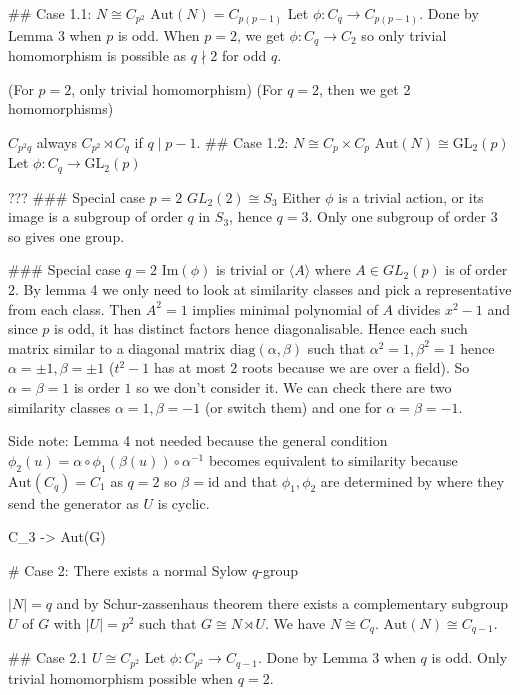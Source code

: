 ## Case 1.1: $N \cong C_{p^2}$
$\text{Aut}(N) = C_{p(p-1)}$
Let $\phi : C_q \rightarrow C_{p(p-1)}$. Done by Lemma 3 when $p$ is odd. When $p = 2$, we get $\phi : C_q \rightarrow C_2$ so only trivial homomorphism is possible as $q \nmid 2$ for odd $q$.

(For $p = 2$, only trivial homomorphism)
(For $q = 2$, then we get 2 homomorphisms)

$C_{p^2 q}$ always
$C_{p^2} \rtimes C_q$ if $q \mid p - 1$.
## Case 1.2: $N \cong C_p \times C_p$
$\text{Aut}(N) \cong \text{GL}_2(p)$
Let $\phi : C_q \rightarrow \text{GL}_2(p)$

???
### Special case $p = 2$
$GL_2(2) \cong S_3$
Either $\phi$ is a trivial action, or its image is a subgroup of order $q$ in $S_3$, hence $q = 3$. Only one subgroup of order $3$ so gives one group.

### Special case $q = 2$
$\text{Im}(\phi)$ is trivial or $\langle A \rangle$ where $A \in GL_2(p)$ is of order $2$. By lemma 4 we only need to look at similarity classes and pick a representative from each class. Then $A^2 = 1$ implies minimal polynomial of $A$ divides $x^2 - 1$ and since $p$ is odd, it has distinct factors hence diagonalisable. Hence each such matrix similar to a diagonal matrix $\text{diag}(\alpha, \beta)$ such that $\alpha^2 = 1, \beta^2 = 1$ hence $\alpha = \pm 1, \beta = \pm 1$ ($t^2 - 1$ has at most $2$ roots because we are over a field). So $\alpha = \beta = 1$ is order $1$ so we don't consider it. We can check there are two similarity classes $\alpha = 1, \beta = -1$ (or switch them) and one for $\alpha = \beta = -1$.

Side note: Lemma 4 not needed because the general condition $\phi_2(u) = \alpha \circ \phi_1(\beta(u)) \circ \alpha^{-1}$ becomes equivalent to similarity because $\text{Aut}(C_q) = C_1$ as $q = 2$ so $\beta = \text{id}$ and that $\phi_1, \phi_2$ are determined by where they send the generator as $U$ is cyclic.

C_3 -> Aut(G)

# Case 2: There exists a normal Sylow $q$-group

$|N| = q$ and by Schur-zassenhaus theorem there exists a complementary subgroup $U$ of $G$ with $|U| = p^2$ such that $G \cong N \rtimes U$. We have $N \cong C_q$. $\text{Aut}(N) \cong C_{q-1}$.

## Case 2.1 $U \cong C_{p^2}$
Let $\phi : C_{p^2} \rightarrow C_{q-1}$. Done by Lemma 3 when $q$ is odd. Only trivial homomorphism possible when $q = 2$.

